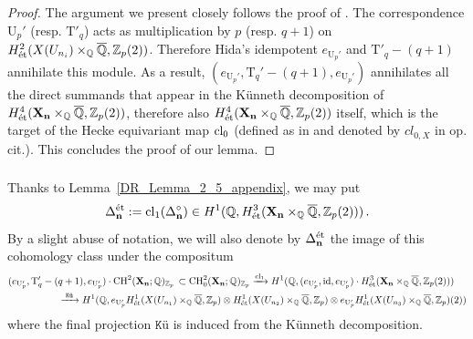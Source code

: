 \documentclass{amsart}
\numberwithin{equation}{section}
\newcommand{\QQ}{\mathbb{Q}}
\newcommand{\ZZ}{\mathbb{Z}}
\newcommand{\etale}{\textup{\'et}}
\newcommand{\Q}{\QQ}
\begin{document}
\begin{proof}
The argument we present closely follows the proof of \cite[Lemma 2.5]{DarmonRotger}. The correspondence $\mathrm{U}_{p}'$ (resp. $\mathrm{T}'_q$) acts as multiplication by $p$ (resp. $q+1$) on 
$H^2_{\etale}({X}(U_{n_i})\times_{\QQ}\overline{\QQ},\ZZ_p(2))$. 
Therefore Hida's idempotent $e_{\mathrm{U}_{p}'}$ and $\mathrm{T}'_q-(q+1)$ annihilate this module. As a result, $(e_{\mathrm{U}_{p}'}, \mathrm{T}_{q}'-(q+1), e_{\mathrm{U}_{p}'})$  annihilates all the direct summands that appear in the K\"unneth decomposition of $H^4_{\etale}(\mathbf{X}_{\mathbf{n}}\times_{\QQ}\overline{\QQ},\ZZ_p(2))$, therefore also $H^4_{\etale}(\mathbf{X}_{\mathbf{n}}\times_{\QQ}\overline{\QQ},\ZZ_p(2))$ itself, which is the target of the Hecke equivariant map ${\rm cl}_0$ (defined as in \cite[\S1.2]{nekovarbanff} and denoted by $cl_{0,X}$ in op. cit.). This concludes the proof of our lemma. 
\end{proof}

\subsubsection{} Thanks to Lemma~\ref{DR_Lemma_2_5_appendix}, we may put 
\begin{equation}
\label{eqn_2023_11_08_1512_bis}
   \Delta_{\mathbf{n}}^{\etale} := {\rm cl}_1(\Delta_{{\mathbf{n}}}^{\circ})\in H^1(\Q,  H^3_{\etale} (\mathbf{X}_{\mathbf{n}}\times_{\QQ} \overline{\QQ}, \ZZ_p(2)))\,.
\end{equation} 
By a slight abuse of notation, we will also denote by $\Delta_{\mathbf{n}}^{\etale}$ the image of this cohomology class under the compositum
\small 
\begin{align*}
&(e_{\mathrm{U}_{p}'}, \mathrm{T}_{q}'-(q+1), e_{\mathrm{U}_{p}'})\cdot {\rm CH}^2(\mathbf{X}_{\mathbf{n}};\QQ)_{\ZZ_p}\,\subset {\rm CH}^2_0(\mathbf{X}_{\mathbf{n}};\QQ)_{\ZZ_p}\xrightarrow{{\rm cl}_1}  H^1(\QQ,  (e_{\mathrm{U}_{p}'}, {\rm id}, e_{\mathrm{U}_{p}'})\cdot  H^3_{\etale} (\mathbf{X}_{\mathbf{n}}\times_{\QQ}
\overline{\QQ}, \ZZ_p(2)))\\
&\hspace{1.8cm}\xrightarrow{\,\,\texttt{K\"u}\,\,} H^1(\QQ,  e_{\mathrm{U}_{p}'} H^1_{\etale} (X(U_{n_1})\times_{\QQ}
\overline{\QQ}, \ZZ_p)\otimes H^1_{\etale} (X(U_{n_2})\times_{\QQ}
\overline{\QQ}, \ZZ_p)\otimes e_{\mathrm{U}_{p}'} H^1_{\etale} (X(U_{n_3})\times_{\QQ}
\overline{\QQ}, \ZZ_p)(2))
\end{align*}
\normalsize
where the final projection $\texttt{K\"u}$ is induced from the K\"unneth decomposition.
\end{document}
